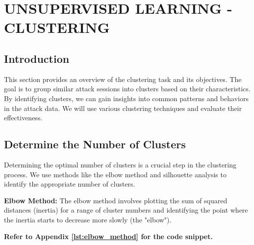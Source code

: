 

\section{UNSUPERVISED LEARNING - CLUSTERING}


    \subsection{Introduction}
    
        This section provides an overview of the clustering task and its objectives. The goal is to group similar attack sessions into clusters based on their characteristics. By identifying clusters, we can gain insights into common patterns and behaviors in the attack data. We will use various clustering techniques and evaluate their effectiveness.

    \subsection{Determine the Number of Clusters}
    
        Determining the optimal number of clusters is a crucial step in the clustering process. We use methods like the elbow method and silhouette analysis to identify the appropriate number of clusters.

        \textbf{Elbow Method:} The elbow method involves plotting the sum of squared distances (inertia) for a range of cluster numbers and identifying the point where the inertia starts to decrease more slowly (the "elbow").
    
        \vspace{0.5em}

        \textbf{Refer to Appendix \ref{lst:elbow_method} for the code snippet.}

